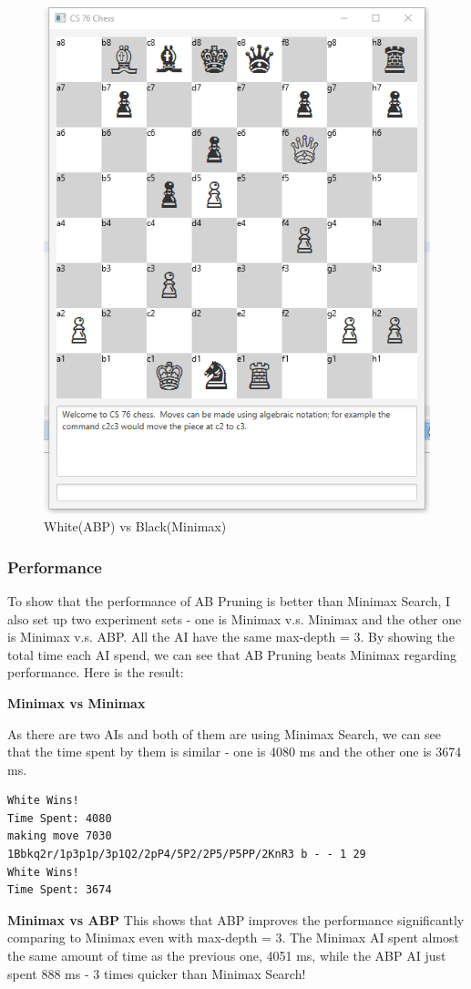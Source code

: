 \documentclass{article}
\begin{document}
\begin{figure}[H]
\centering
\includegraphics[width=0.7\linewidth]{W_ABP_B_MINI}
\caption{White(ABP) vs Black(Minimax)}
\end{figure}

\subsubsection{Performance}
To show that the performance of AB Pruning is better than Minimax Search, I also set up two experiment sets - one is Minimax v.s. Minimax and the other one is Minimax v.s. ABP. All the AI have the same max-depth = 3. By showing the total time each AI spend, we can see that AB Pruning beats Minimax regarding performance. Here is the result:

\textbf{Minimax vs Minimax}

As there are two AIs and both of them are using Minimax Search, we can see that the time spent by them is similar - one is 4080 ms and the other one is 3674 ms.
\begin{lstlisting}
White Wins!
Time Spent: 4080
making move 7030
1Bbkq2r/1p3p1p/3p1Q2/2pP4/5P2/2P5/P5PP/2KnR3 b - - 1 29
White Wins!
Time Spent: 3674
\end{lstlisting}

\textbf{Minimax vs ABP}
This shows that ABP improves the performance significantly comparing to Minimax even with max-depth = 3. The Minimax AI spent almost the same amount of time as the previous one, 4051 ms, while the ABP AI just spent 888 ms - 3 times quicker than Minimax Search!
\end{document}

